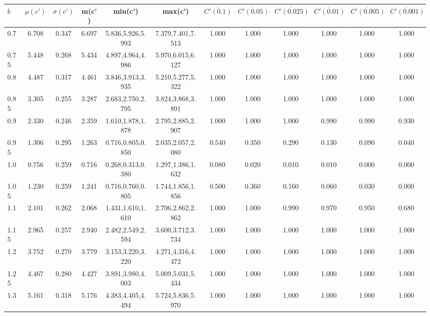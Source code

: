 \begin{table*}[h]
\begin{center}
\begin{tabular}{| l | c | c | c | c | c | c | c | c | c | c | c |}\hline
$b$ & $\mu(c')$ & $\sigma(c')$ & m(c') & min(c') & max(c') & $\overline{C'(0.1)}$ & $\overline{C'(0.05)}$ & $\overline{C'(0.025)}$ & $\overline{C'(0.01)}$ & $\overline{C'(0.005)}$ & $\overline{C'(0.001)}$ \\\hline
0.7 & 6.708 & 0.347 & 6.697 & 5.836,5.926,5.993 & 7.379,7.401,7.513  & 1.000  & 1.000  & 1.000  & 1.000  & 1.000  & 1.000 \\\hline
0.75 & 5.448 & 0.268 & 5.434 & 4.897,4.964,4.986 & 5.970,6.015,6.127  & 1.000  & 1.000  & 1.000  & 1.000  & 1.000  & 1.000 \\\hline
0.8 & 4.487 & 0.317 & 4.461 & 3.846,3.913,3.935 & 5.210,5.277,5.322  & 1.000  & 1.000  & 1.000  & 1.000  & 1.000  & 1.000 \\\hline
0.85 & 3.305 & 0.255 & 3.287 & 2.683,2.750,2.795 & 3.824,3.868,3.891  & 1.000  & 1.000  & 1.000  & 1.000  & 1.000  & 1.000 \\\hline
0.9 & 2.330 & 0.246 & 2.359 & 1.610,1.878,1.878 & 2.795,2.885,2.907  & 1.000  & 1.000  & 1.000  & 0.990  & 0.990  & 0.930 \\\hline
0.95 & 1.306 & 0.295 & 1.263 & 0.716,0.805,0.850 & 2.035,2.057,2.080  & 0.540  & 0.350  & 0.290  & 0.130  & 0.090  & 0.040 \\\hline
1.0 & 0.756 & 0.259 & 0.716 & 0.268,0.313,0.380 & 1.297,1.386,1.632  & 0.080  & 0.020  & 0.010  & 0.010  & 0.000  & 0.000 \\\hline
1.05 & 1.230 & 0.259 & 1.241 & 0.716,0.760,0.805 & 1.744,1.856,1.856  & 0.500  & 0.360  & 0.160  & 0.060  & 0.030  & 0.000 \\\hline
1.1 & 2.101 & 0.262 & 2.068 & 1.431,1.610,1.610 & 2.706,2.862,2.862  & 1.000  & 1.000  & 0.990  & 0.970  & 0.950  & 0.680 \\\hline
1.15 & 2.965 & 0.257 & 2.940 & 2.482,2.549,2.594 & 3.600,3.712,3.734  & 1.000  & 1.000  & 1.000  & 1.000  & 1.000  & 1.000 \\\hline
1.2 & 3.752 & 0.270 & 3.779 & 3.153,3.220,3.220 & 4.271,4.316,4.472  & 1.000  & 1.000  & 1.000  & 1.000  & 1.000  & 1.000 \\\hline
1.25 & 4.467 & 0.280 & 4.427 & 3.891,3.980,4.003 & 5.009,5.031,5.434  & 1.000  & 1.000  & 1.000  & 1.000  & 1.000  & 1.000 \\\hline
1.3 & 5.161 & 0.318 & 5.176 & 4.383,4.405,4.494 & 5.724,5.836,5.970  & 1.000  & 1.000  & 1.000  & 1.000  & 1.000  & 1.000 \\\hline

\end{tabular}
\end{center}
\end{table*}
